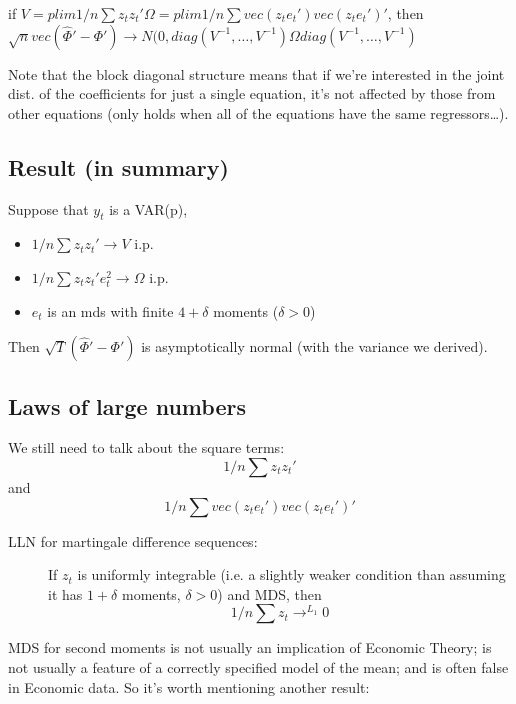 if $V = plim 1/n ∑ z_t z_t' Ω = plim 1/n ∑ vec( z_t e_t' ) vec( z_t
e_t' )'$, then $\sqrt{n} vec(\hat Φ' - Φ' ) → N( 0, diag(
V^{-1},…, V^{-1} ) Ω diag(V^{-1},…,V^{-1} )$

Note that the block diagonal structure means that if we're interested
in the joint dist. of the coefficients for just a single equation,
it's not affected by those from other equations (only holds when all
of the equations have the same regressors…).

\subsection{Result (in summary)}

Suppose that $y_t$ is a VAR(p),
\begin{itemize}
\item $1/n ∑ z_t z_t' → V$ i.p.
\item $1/n ∑ z_t z_t' e_t^2 → Ω$ i.p.
\item $e_t$ is an mds with finite $4 + δ$ moments ($δ > 0$)
\end{itemize}
Then $\sqrt{T} ( \hat Φ' - Φ' )$ is asymptotically normal (with the
variance we derived).

\subsection{Laws of large numbers}
We still need to talk about the square terms:
\[1/n ∑ z_t z_t'\]
and
\[1/n ∑ vec( z_t e_t' ) vec( z_t e_t' )'\]
\begin{description}
\item[LLN for martingale difference sequences:]
If $z_t$ is uniformly integrable (i.e. a slightly weaker condition than
assuming it has $1 + δ$ moments, $δ > 0$) and MDS, then
\[1/n ∑ z_t →^{L_1} 0\]
\end{description}

MDS for second moments is not usually an implication of Economic
Theory; is not usually a feature of a correctly specified model of the
mean; and is often false in Economic data. So it's worth mentioning
another result:

